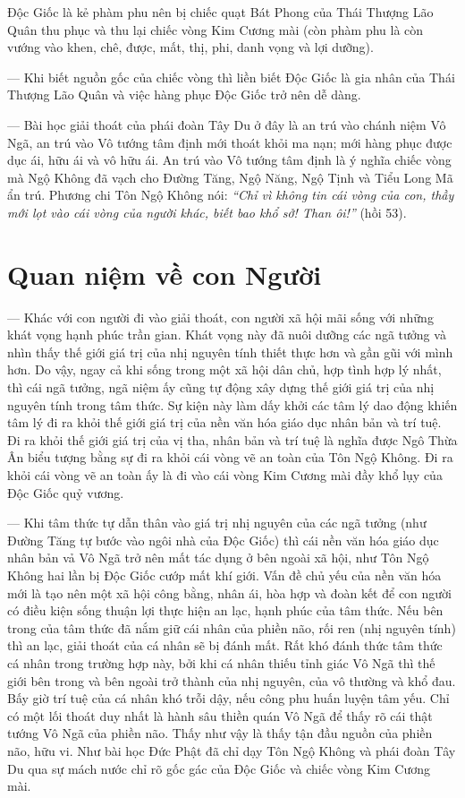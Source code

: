 Độc Giốc là kẻ phàm phu nên bị chiếc quạt Bát Phong của Thái Thượng Lão Quân thu phục và thu lại chiếc vòng Kim Cương mài (còn phàm phu là còn vướng vào khen, chê, được, mất, thị, phi, danh vọng và lợi dưỡng).

— Khi biết nguồn gốc của chiếc vòng thì liền biết Độc Giốc là gia nhân của Thái Thượng Lão Quân và việc hàng phục Độc Giốc trở nên dễ dàng.

— Bài học giải thoát của phái đoàn Tây Du ở đây là an trú vào chánh niệm Vô Ngã, an trú vào Vô tướng tâm định mới thoát khỏi ma nạn; mới hàng phục được dục ái, hữu ái và vô hữu ái. An trú vào Vô tướng tâm định là ý nghĩa chiếc vòng mà Ngộ Không đã vạch cho Đường Tăng, Ngộ Năng, Ngộ Tịnh và Tiểu Long Mã ẩn trú. Phương chi Tôn Ngộ Không nói: \emph{``Chỉ vì không tin cái vòng của con, thầy mới lọt vào cái vòng của người khác, biết bao khổ sở! Than ôi!''} (hồi 53).

\section{Quan niệm về con Người} %
\label{sec:50_51_con_nguoi}

— Khác với con người đi vào giải thoát, con người xã hội mãi sống với những khát vọng hạnh phúc trần gian. Khát vọng này đã nuôi dưỡng các ngã tưởng và nhìn thấy thế giới giá trị của nhị nguyên tính thiết thực hơn và gần gũi với mình hơn. Do vậy, ngay cả khi sống trong một xã hội dân chủ, hợp tình hợp lý nhất, thì cái ngã tưởng, ngã niệm ấy cũng tự động xây dựng thế giới giá trị của nhị nguyên tính trong tâm thức. Sự kiện này làm dấy khởi các tâm lý dao động khiến tâm lý đi ra khỏi thế giới giá trị của nền văn hóa giáo dục nhân bản và trí tuệ. Đi ra khỏi thế giới giá trị của vị tha, nhân bản và trí tuệ là nghĩa được Ngô Thừa Ân biểu tượng bằng sự đi ra khỏi cái vòng vẽ an toàn của Tôn Ngộ Không. Đi ra khỏi cái vòng vẽ an toàn ấy là đi vào cái vòng Kim Cương mài đầy khổ lụy của Độc Giốc quỷ vương.

— Khi tâm thức tự dẫn thân vào giá trị nhị nguyên của các ngã tưởng (như Đường Tăng tự bước vào ngôi nhà của Độc Giốc) thì cái nền văn hóa giáo dục nhân bản vả Vô Ngã trở nên mất tác dụng ở bên ngoài xã hội, như Tôn Ngộ Không hai lần bị Độc Giốc cướp mất khí giới. Vấn đề chủ yếu của nền văn hóa mới là tạo nên một xã hội công bằng, nhân ái, hòa hợp và đoàn kết để con người có điều kiện sống thuận lợi thực hiện an lạc, hạnh phúc của tâm thức. Nếu bên trong của tâm thức đã nắm giữ cái nhân của phiền não, rối ren (nhị nguyên tính) thì an lạc, giải thoát của cá nhân sẽ bị đánh mất. Rất khó đánh thức tâm thức cá nhân trong trường hợp này, bởi khi cá nhân thiếu tỉnh giác Vô Ngã thì thế giới bên trong và bên ngoài trở thành của nhị nguyên, của vô thường và khổ đau. Bấy giờ trí tuệ của cá nhân khó trỗi dậy, nếu công phu huấn luyện tâm yếu. Chỉ có một lối thoát duy nhất là hành sâu thiền quán Vô Ngã để thấy rõ cái thật tướng Vô Ngã của phiền não. Thấy như vậy là thấy tận đầu nguồn của phiền não, hữu vi. Như bài học Đức Phật đã chỉ dạy Tôn Ngộ Không và phái đoàn Tây Du qua sự mách nước chỉ rõ gốc gác của Độc Giốc và chiếc vòng Kim Cương mài.

